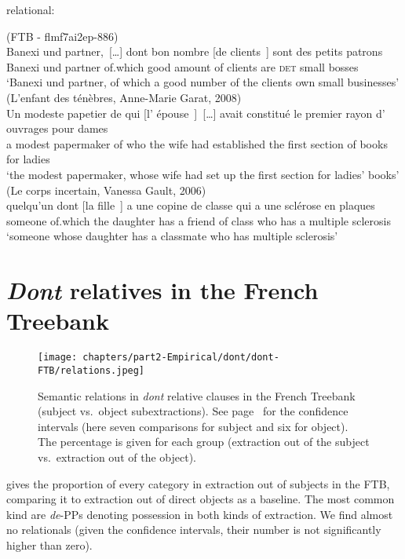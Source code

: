 \begin{exe}
\ex relational: \label{ex:relational}
\begin{xlist}
\ex(FTB - flmf7ai2ep-886)\\
\gll Banexi und partner,~[\dots] dont bon nombre [de clients~\trace{}] sont des petits patrons\\
Banexi und partner of.which good amount of clients are \textsc{det} small bosses\\
\glt `Banexi und partner, of which a good number of the clients own small businesses'
\ex (L'enfant des ténèbres, Anne-Marie Garat, 2008)\\
\gll Un modeste papetier de qui [l' épouse~\trace{}]~[\dots] avait constitué le premier rayon d' ouvrages pour dames\\
a modest papermaker of who the wife had established the first section of books for ladies\\
\glt `the modest papermaker, whose wife had set up the first section for ladies' books'
\ex (Le corps incertain, Vanessa Gault, 2006)\\
\gll quelqu'un dont [la fille~\trace{}] a une copine de classe qui a une {sclérose en plaques}\\
someone of.which the daughter has a friend of class who has a {multiple sclerosis}\\ 
\glt `someone whose daughter has a classmate who has multiple sclerosis'
\end{xlist}
\end{exe}

\section{\emph{Dont} relatives in the French Treebank}


\begin{figure}
        \centering
        \texttt{[image: chapters/part2-Empirical/dont/dont-FTB/relations.jpeg]}
        \caption{Semantic relations in \emph{dont} relative clauses in the French Treebank (subject vs.\ object subextractions). See page~\pageref{ch:conf-intervals-binomial} for the confidence intervals (here seven comparisons for subject and six for object). The percentage is given for each group (extraction out of the subject vs.\ extraction out of the object).}
        \label{fig:dont-FTB-relations}
\end{figure}

 gives the proportion of every category in extraction out of subjects in the FTB, comparing it to extraction out of direct objects as a baseline. The most common kind are \emph{de}-PPs denoting possession in both kinds of extraction. We find almost no relationals (given the confidence intervals, their number is not significantly higher than zero).

